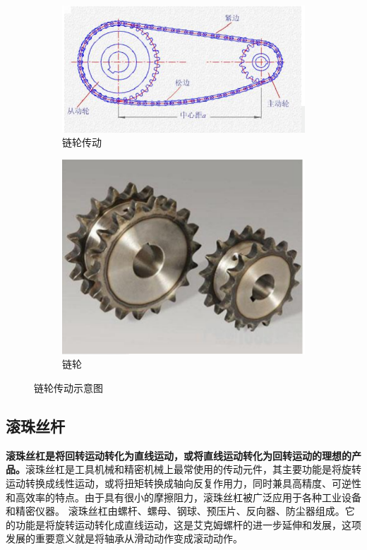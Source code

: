 \documentclass[UTF8]{article} %
\begin{document}
\begin{figure}[H]
  \centering
  \begin{subfigure}[b]{0.4\textwidth}
         \centering
         \includegraphics[width=\textwidth]{ll1.png}
          \caption{链轮传动}
  \end{subfigure}
  \quad
  \begin{subfigure}[b]{0.3\textwidth}
          \centering
          \includegraphics[width=\textwidth]{ll2.png}
          \caption{链轮}
  \end{subfigure}
  \caption{链轮传动示意图}
\end{figure}

\subsection{滚珠丝杆}
\textbf{滚珠丝杠是将回转运动转化为直线运动，或将直线运动转化为回转运动的理想的产品。}滚珠丝杠是工具机械和精密机械上最常使用的传动元件，其主要功能是将旋转运动转换成线性运动，或将扭矩转换成轴向反复作用力，同时兼具高精度、可逆性和高效率的特点。由于具有很小的摩擦阻力，滚珠丝杠被广泛应用于各种工业设备和精密仪器。
滚珠丝杠由螺杆、螺母、钢球、预压片、反向器、防尘器组成。它的功能是将旋转运动转化成直线运动，这是艾克姆螺杆的进一步延伸和发展，这项发展的重要意义就是将轴承从滑动动作变成滚动动作。
\end{document}
